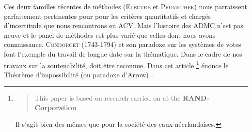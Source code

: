 Ces deux familles récentes de méthodes (\textsc{Electre} et \textsc{Promethee}) nous parraissent parfaitement pertinentes pour pour les critères quantitatifs et chargés d'incertitude que nous rencontrons en \gls{ACV}.
Mais l'histoire des \gls{ADMC} n'est pas neuve et le panel de méthodes est plus varié que celles dont nous avons connaissance.
\textsc{Condorcet} (1743-1794) et son paradoxe sur les systèmes de votes font l'exemple du travail de longue date sur la thématique.
Dans le cadre de nos travaux sur la soutenabilité,  doit être reconnue.
Dans cet article \citeauthor{arrow_difficulty_1950}
\footnote{
\blockcquote{arrow_difficulty_1950}{This paper is based on research carried on at the \textbf{RAND- Corporation}}.
Il s'agit bien des mêmes que pour la société des eaux néerlandaises.
}
énonce le Théorème d'impossibilité (ou paradoxe d'Arrow)~\cite{arrow_difficulty_1950}.
\label{Annexe:Arrow}

